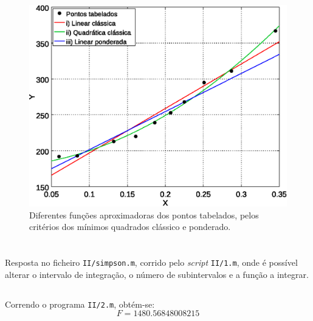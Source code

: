 \documentclass[portuguese, a4paper]{article}
\begin{document}
	\begin{figure}[H]
		\centering
		\includegraphics[width=0.80\linewidth]{I_fino}
		\captionsetup{width=0.80\linewidth}
		\caption{Diferentes funções aproximadoras dos pontos tabelados, pelos critérios dos mínimos quadrados clássico e ponderado.}
	\end{figure}

\newpage
\section{} \label{sec:II}
	\subsection{} \label{sec:II.1}
	\par
	Resposta no ficheiro \texttt{II/simpson.m}, corrido pelo \emph{script} \texttt{II/1.m}, onde é possível alterar o intervalo de integração, o número de subintervalos e a função a integrar.

	\subsection{} \label{sec:II.2}
	\subsubsection{} \label{sec:II.2a)}
	\par
	Correndo o programa \texttt{II/2.m}, obtém-se:
	$$F =  1480.56848008215$$
\end{document}

